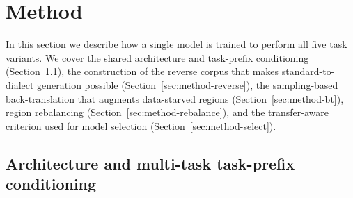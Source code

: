 \documentclass[11pt]{article}
\begin{document}




\section{Method}
\label{sec:method}

In this section we describe how a single model is trained to perform all five
task variants. We cover the shared architecture and task-prefix conditioning
(Section~\ref{sec:method-arch}), the construction of the reverse corpus that
makes standard-to-dialect generation possible (Section~\ref{sec:method-reverse}),
the sampling-based back-translation that augments data-starved regions
(Section~\ref{sec:method-bt}), region rebalancing
(Section~\ref{sec:method-rebalance}), and the transfer-aware criterion used for
model selection (Section~\ref{sec:method-select}).

\subsection{Architecture and multi-task task-prefix conditioning}
\label{sec:method-arch}
\end{document}
